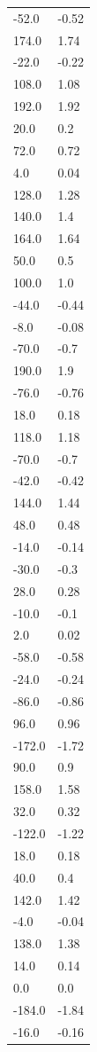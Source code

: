 \begin{longtable}{ll}
-52.0 & -0.52 \\
174.0 & 1.74 \\
-22.0 & -0.22 \\
108.0 & 1.08 \\
192.0 & 1.92 \\
20.0 & 0.2 \\
72.0 & 0.72 \\
4.0 & 0.04 \\
128.0 & 1.28 \\
140.0 & 1.4 \\
164.0 & 1.64 \\
50.0 & 0.5 \\
100.0 & 1.0 \\
-44.0 & -0.44 \\
-8.0 & -0.08 \\
-70.0 & -0.7 \\
190.0 & 1.9 \\
-76.0 & -0.76 \\
18.0 & 0.18 \\
118.0 & 1.18 \\
-70.0 & -0.7 \\
-42.0 & -0.42 \\
144.0 & 1.44 \\
48.0 & 0.48 \\
-14.0 & -0.14 \\
-30.0 & -0.3 \\
28.0 & 0.28 \\
-10.0 & -0.1 \\
2.0 & 0.02 \\
-58.0 & -0.58 \\
-24.0 & -0.24 \\
-86.0 & -0.86 \\
96.0 & 0.96 \\
-172.0 & -1.72 \\
90.0 & 0.9 \\
158.0 & 1.58 \\
32.0 & 0.32 \\
-122.0 & -1.22 \\
18.0 & 0.18 \\
40.0 & 0.4 \\
142.0 & 1.42 \\
-4.0 & -0.04 \\
138.0 & 1.38 \\
14.0 & 0.14 \\
0.0 & 0.0 \\
-184.0 & -1.84 \\
-16.0 & -0.16 \\

\end{longtable}
